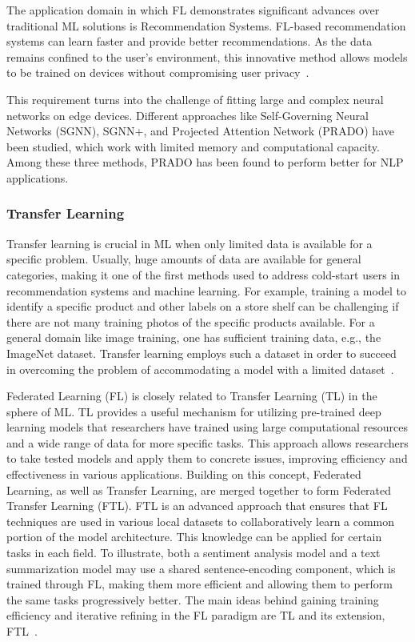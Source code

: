 The application domain in which FL demonstrates significant advances over traditional ML solutions is Recommendation Systems. FL-based recommendation systems can learn faster and provide better recommendations. As the data remains confined to the user's environment, this innovative method allows models to be trained on devices without compromising user privacy~\cite{ref9}.

This requirement turns into the challenge of fitting large and complex neural networks on edge devices. Different approaches like Self-Governing Neural Networks (SGNN), SGNN+, and Projected Attention Network (PRADO) have been studied, which work with limited memory and computational capacity. Among these three methods, PRADO has been found to perform better for NLP applications.

\subsubsection{Transfer Learning}
Transfer learning is crucial in ML when only limited data is available for a specific problem. Usually, huge amounts of data are available for general categories, making it one of the first methods used to address cold-start users in recommendation systems and machine learning. For example, training a model to identify a specific product and other labels on a store shelf can be challenging if there are not many training photos of the specific products available. For a general domain like image training, one has sufficient training data, e.g., the ImageNet dataset. Transfer learning employs such a dataset in order to succeed in overcoming the problem of accommodating a model with a limited dataset~\cite{ref11}.

Federated Learning (FL) is closely related to Transfer Learning (TL) in the sphere of ML. TL provides a useful mechanism for utilizing pre-trained deep learning models that researchers have trained using large computational resources and a wide range of data for more specific tasks. This approach allows researchers to take tested models and apply them to concrete issues, improving efficiency and effectiveness in various applications. Building on this concept, Federated Learning, as well as Transfer Learning, are merged together to form Federated Transfer Learning (FTL). FTL is an advanced approach that ensures that FL techniques are used in various local datasets to collaboratively learn a common portion of the model architecture. This knowledge can be applied for certain tasks in each field. To illustrate, both a sentiment analysis model and a text summarization model may use a shared sentence-encoding component, which is trained through FL, making them more efficient and allowing them to perform the same tasks progressively better. The main ideas behind gaining training efficiency and iterative refining in the FL paradigm are TL and its extension, FTL~\cite{ref12}.

